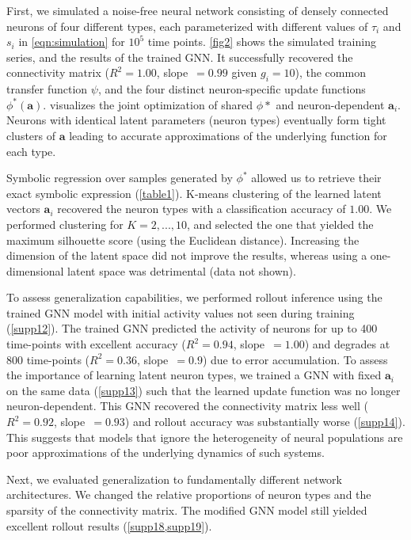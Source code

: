 \documentclass[10pt,twocolumn]{article}
\renewcommand\Vec[1]{\ensuremath{\boldsymbol{#1}}}
\begin{document}
First, we simulated a noise-free neural network consisting of  densely connected neurons of four different types, each parameterized with different values of $\tau_i$ and $s_i$ in \cref{eqn:simulation} for $10^5$ time points. \cref{fig2} shows the simulated training series, and the results of the trained GNN.  It successfully recovered the connectivity matrix ($R^2=1.00$, \mbox{slope~$=0.99$} given $g_i=10$), the common transfer function $\psi$, and the four distinct neuron-specific update functions $\phi^*(\Vec{a})$.    visualizes the joint optimization of shared $\phi*$ and neuron-dependent $\Vec{a}_i$.  Neurons with identical latent parameters (neuron types) eventually form tight clusters of $\Vec{a}$ leading to accurate approximations of the underlying function for each type.

Symbolic regression \citep[PySR package;][]{cranmer_interpretable_2023} over samples generated by $\phi^*$ allowed us to retrieve their exact symbolic expression (\cref{table1}). K-means clustering of the learned latent vectors $\Vec{a}_i$ recovered the neuron types with a classification accuracy of $1.00$. We performed clustering for $K=2,...,10$, and selected the one that yielded the maximum silhouette score (using the Euclidean distance). Increasing the dimension of the latent space did not improve the results, whereas using a one-dimensional latent space was detrimental (data not shown).

To assess generalization capabilities, we performed rollout inference using the trained GNN model with initial activity values not seen during training (\cref{supp12}). The trained GNN predicted the activity of  neurons for up to 400 time-points with excellent accuracy ($R^2=0.94$, slope~$=1.00$) and degrades at 800 time-points ($R^2=0.36$, slope~$=0.9$) due to error accumulation.
To assess the importance of learning latent neuron types, we trained a GNN with fixed $\Vec{a}_i$ on the same data (\cref{supp13}) such that the learned update function was no longer neuron-dependent. This GNN recovered the connectivity matrix less well ($R^2=0.92$, slope~$=0.93$) and rollout accuracy was substantially worse (\cref{supp14}).  This suggests that models that ignore the heterogeneity of neural populations are poor approximations of the underlying dynamics of such systems.

Next, we evaluated generalization to fundamentally different network architectures.  We changed the relative proportions of neuron types and the sparsity of the connectivity matrix. The modified GNN model still yielded excellent rollout results (\cref{supp18,supp19}).
\end{document}
